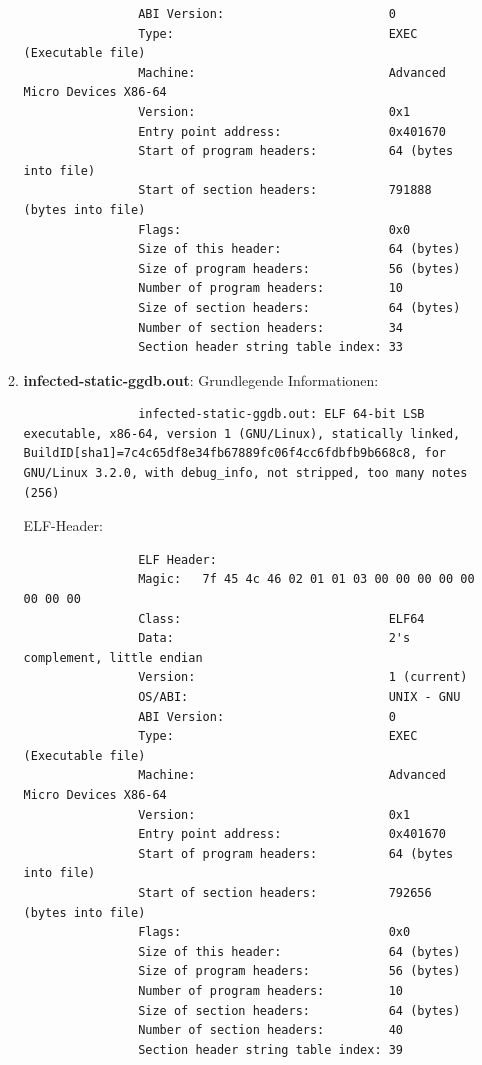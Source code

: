 \documentclass{article}
\begin{document}
\begin{enumerate}
\begin{enumerate}
\begin{lstlisting}
				ABI Version:                       0
				Type:                              EXEC (Executable file)
				Machine:                           Advanced Micro Devices X86-64
				Version:                           0x1
				Entry point address:               0x401670
				Start of program headers:          64 (bytes into file)
				Start of section headers:          791888 (bytes into file)
				Flags:                             0x0
				Size of this header:               64 (bytes)
				Size of program headers:           56 (bytes)
				Number of program headers:         10
				Size of section headers:           64 (bytes)
				Number of section headers:         34
				Section header string table index: 33
			\end{lstlisting}
			\item \textbf{infected-static-ggdb.out}:
			Grundlegende Informationen:\\
			\begin{lstlisting}
				infected-static-ggdb.out: ELF 64-bit LSB executable, x86-64, version 1 (GNU/Linux), statically linked, BuildID[sha1]=7c4c65df8e34fb67889fc06f4cc6fdbfb9b668c8, for GNU/Linux 3.2.0, with debug_info, not stripped, too many notes (256)
			\end{lstlisting}
			ELF-Header:\\
			\begin{lstlisting}
				ELF Header:
				Magic:   7f 45 4c 46 02 01 01 03 00 00 00 00 00 00 00 00
				Class:                             ELF64
				Data:                              2's complement, little endian
				Version:                           1 (current)
				OS/ABI:                            UNIX - GNU
				ABI Version:                       0
				Type:                              EXEC (Executable file)
				Machine:                           Advanced Micro Devices X86-64
				Version:                           0x1
				Entry point address:               0x401670
				Start of program headers:          64 (bytes into file)
				Start of section headers:          792656 (bytes into file)
				Flags:                             0x0
				Size of this header:               64 (bytes)
				Size of program headers:           56 (bytes)
				Number of program headers:         10
				Size of section headers:           64 (bytes)
				Number of section headers:         40
				Section header string table index: 39
			\end{lstlisting}
		\end{enumerate}
	\end{enumerate}
	
\end{document}
